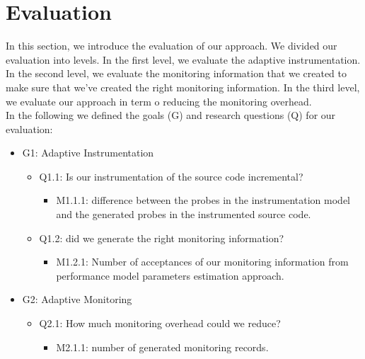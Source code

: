 
\chapter{Evaluation}
\label{ch:Evaluation}

In this section, we introduce the evaluation of our approach. We divided our evaluation into levels. In the first level, we evaluate the adaptive instrumentation. In the second level, we evaluate the monitoring information that we created to make sure that we’ve created the right monitoring information. In the third level, we evaluate our approach in term o reducing the monitoring overhead. \\
In the following we defined the goals (G) and research questions (Q) for our evaluation:

\begin{itemize}[label={}, leftmargin=*]
\item G1: Adaptive Instrumentation
  \begin{itemize}[label={}]
  \item Q1.1: Is our instrumentation of the source code incremental?
      \begin{itemize}[label={}]
      \item M1.1.1: difference between the probes in the instrumentation model and the generated probes in the            
                    instrumented source code.  
      \end{itemize}
   \item Q1.2: did we generate the right monitoring information?
        \begin{itemize}[label={}]
             \item M1.2.1: Number of acceptances of our monitoring information from performance model parameters  
	                       estimation approach.
      \end{itemize}
  \end{itemize}
\item G2: Adaptive Monitoring
   \begin{itemize}[label={}]
   \item Q2.1: How much monitoring overhead could we reduce?
       \begin{itemize}[label={}]
        \item M2.1.1: number of generated monitoring records. 
       \end{itemize}
   \end{itemize}
\end{itemize}



